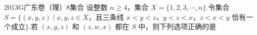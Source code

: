 
\begin{problem}{2013}{G}{广东卷（理）}{8}{集合}
设整数 $ n\geq 4 $，集合 $ X=\{1,2,3,\cdots,n\} $.令集合 $ S=\{(x,y,z)\mid x,y,z\in X $，且三条线 $ x<y<z $，$ y<z<x $，$ z<x<y $ 恰有一个成立$ \} $.若 $ (x,y,z) $ 和 $ (z,w,x) $ 都在 $ S $ 中，则下列选项正确的是

\begin{choices}
\end{choices}
\end{problem}

\begin{answer}

\end{answer}

\begin{solutions}

\end{solutions}
